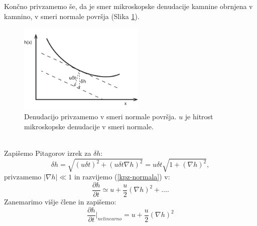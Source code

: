 \documentclass[a4paper, twoside, 12pt]{book}
\begin{document}
Končno privzamemo še, da je smer mikroskopske denudacije kamnine obrnjena v kamnino, v smeri normale površja (Slika \ref{fig:KPZ}). 
\begin{figure}[h!]
  \begin{center}
    \includegraphics[width=6cm]{slike/denudacija}
  \end{center}
  \caption{Denudacijo privzamemo v smeri normale površja. $u$ je hitrost mikroskopske denudacije v smeri normale.}
  \label{fig:KPZ}
\end{figure}
\\ Zapišemo Pitagorov izrek za $\delta h$:
\begin{equation}
  \delta h = \sqrt{(u \delta t)^2 + (u \delta t \nabla h)^2} = u \delta t \sqrt{1 + (\nabla h)^2},
  \label{kpz-normala}
\end{equation}
privzamemo $|\nabla h| \ll 1$ in razvijemo (\ref{kpz-normala}) v:
\begin{equation}
  \frac{\partial h}{\partial t} \simeq u + \frac{u}{2} (\nabla h)^2 + \dots.
\end{equation}
Zanemarimo višje člene in zapišemo:
\begin{equation}
  \frac{\partial h}{\partial t} \bigg|_{nelinearno} = u + \frac{u}{2} (\nabla h)^2
\end{equation}

\end{document}
